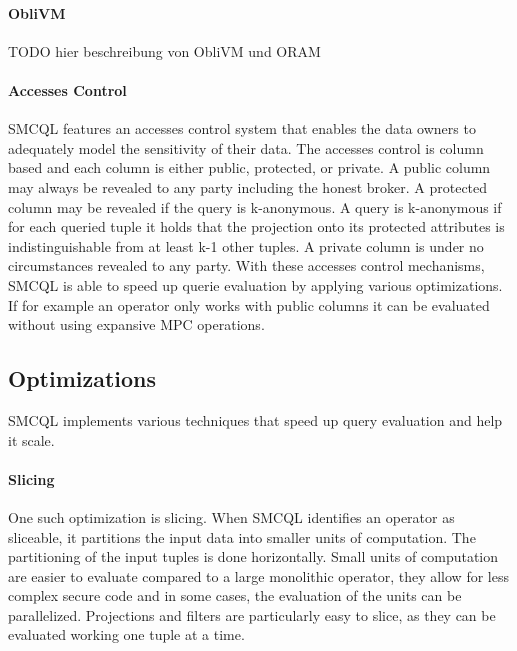 \paragraph{ObliVM}
TODO hier beschreibung von ObliVM und ORAM 

\paragraph{Accesses Control}
SMCQL features an accesses control system that enables the data owners to adequately model the sensitivity of their data. 
The accesses control is column based and each column is either public, protected, or private. 
A public column may always be revealed to any party including the honest broker. A protected column may be revealed if the query is k-anonymous. A query is k-anonymous if for each queried tuple it holds that the projection onto its protected attributes is indistinguishable from at least k-1 other tuples. A private column is under no circumstances revealed to any party. With these accesses control mechanisms, SMCQL is able to speed up querie evaluation by applying various optimizations. If for example an operator only works with public columns it can be evaluated without using expansive MPC operations.


\label{sec:Optimizations_smcql}
\subsection{Optimizations}
SMCQL implements various techniques that speed up query evaluation and help it scale. 
\paragraph{Slicing}
One such optimization is slicing. When SMCQL identifies an operator as sliceable, it partitions the input data into smaller units of computation. The partitioning of the input tuples is done horizontally. Small units of computation are easier to evaluate compared to a large monolithic operator, they allow for less complex secure code and in some cases, the evaluation of the units can be parallelized. Projections and filters are particularly easy to slice, as they can be evaluated working one tuple at a time.
